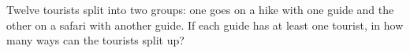 Twelve tourists split into two groups: one goes on a hike with one guide and the other on a safari with another guide. If each guide has at least one tourist, in how many ways can the tourists split up?
